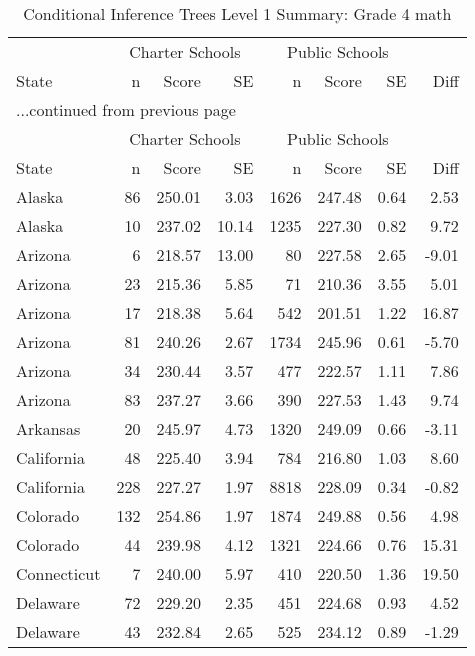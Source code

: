 \begin{longtable}{lrrr@{\extracolsep{10pt}}rrrr}
\caption{Conditional Inference Trees Level 1 Summary: Grade 4 math} \\ 
  \hline
  & \multicolumn{3}{c}{Charter Schools} & \multicolumn{3}{c}{Public Schools} & \\ \cline{2-4} \cline{5-7} State & n & Score & SE & n & Score & SE & Diff \\ \endfirsthead \multicolumn{8}{l}{{...continued from previous page}}\\ \hline & \multicolumn{3}{c}{Charter Schools} & \multicolumn{3}{c}{Public Schools} & \\ \cline{2-4} \cline{5-7} State & n & Score & SE & n & Score & SE & Diff \\ \hline \endhead \hline \endfoot \endlastfoot \hline
Alaska &  86 & 250.01 & 3.03 & 1626 & 247.48 & 0.64 & 2.53 \\ 
  Alaska &  10 & 237.02 & 10.14 & 1235 & 227.30 & 0.82 & 9.72 \\ 
  Arizona &   6 & 218.57 & 13.00 &  80 & 227.58 & 2.65 & -9.01 \\ 
  Arizona &  23 & 215.36 & 5.85 &  71 & 210.36 & 3.55 & 5.01 \\ 
  Arizona &  17 & 218.38 & 5.64 & 542 & 201.51 & 1.22 & 16.87 \\ 
  Arizona &  81 & 240.26 & 2.67 & 1734 & 245.96 & 0.61 & -5.70 \\ 
  Arizona &  34 & 230.44 & 3.57 & 477 & 222.57 & 1.11 & 7.86 \\ 
  Arizona &  83 & 237.27 & 3.66 & 390 & 227.53 & 1.43 & 9.74 \\ 
  Arkansas &  20 & 245.97 & 4.73 & 1320 & 249.09 & 0.66 & -3.11 \\ 
  California &  48 & 225.40 & 3.94 & 784 & 216.80 & 1.03 & 8.60 \\ 
  California & 228 & 227.27 & 1.97 & 8818 & 228.09 & 0.34 & -0.82 \\ 
  Colorado & 132 & 254.86 & 1.97 & 1874 & 249.88 & 0.56 & 4.98 \\ 
  Colorado &  44 & 239.98 & 4.12 & 1321 & 224.66 & 0.76 & 15.31 \\ 
  Connecticut &   7 & 240.00 & 5.97 & 410 & 220.50 & 1.36 & 19.50 \\ 
  Delaware &  72 & 229.20 & 2.35 & 451 & 224.68 & 0.93 & 4.52 \\ 
  Delaware &  43 & 232.84 & 2.65 & 525 & 234.12 & 0.89 & -1.29 \\ 

\end{longtable}
